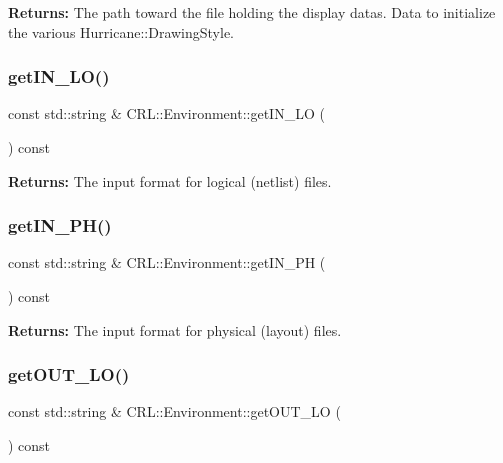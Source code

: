 {\bfseries Returns\+:} The path toward the file holding the display datas. Data to initialize the various Hurricane\+::\+Drawing\+Style. \mbox{\label{classCRL_1_1Environment_accb623ad1312e7f184e2ee9d1f8764f2}} 
\subsubsection{\texorpdfstring{get\+I\+N\+\_\+\+L\+O()}{getIN\_LO()}}
{\footnotesize\ttfamily const std\+::string \& C\+R\+L\+::\+Environment\+::get\+I\+N\+\_\+\+LO (\begin{DoxyParamCaption}{ }\end{DoxyParamCaption}) const\hspace{0.3cm}{\ttfamily [inline]}}

{\bfseries Returns\+:} The input format for logical (netlist) files. \mbox{\label{classCRL_1_1Environment_a3b3c6fb6f26e8029d1f56dd4c7929d16}} 
\subsubsection{\texorpdfstring{get\+I\+N\+\_\+\+P\+H()}{getIN\_PH()}}
{\footnotesize\ttfamily const std\+::string \& C\+R\+L\+::\+Environment\+::get\+I\+N\+\_\+\+PH (\begin{DoxyParamCaption}{ }\end{DoxyParamCaption}) const\hspace{0.3cm}{\ttfamily [inline]}}

{\bfseries Returns\+:} The input format for physical (layout) files. \mbox{\label{classCRL_1_1Environment_a85248fafaf73d8d6a5c388b43566b243}} 
\subsubsection{\texorpdfstring{get\+O\+U\+T\+\_\+\+L\+O()}{getOUT\_LO()}}
{\footnotesize\ttfamily const std\+::string \& C\+R\+L\+::\+Environment\+::get\+O\+U\+T\+\_\+\+LO (\begin{DoxyParamCaption}{ }\end{DoxyParamCaption}) const\hspace{0.3cm}{\ttfamily [inline]}}

